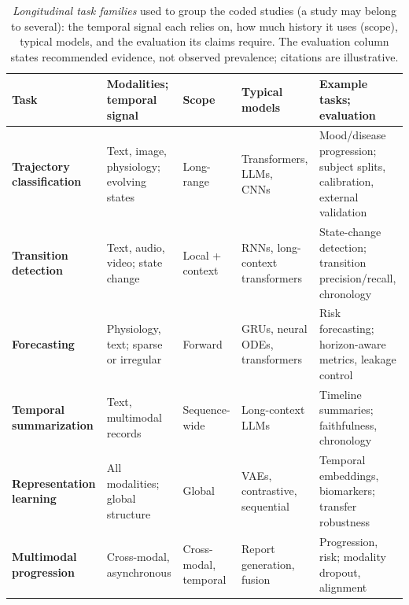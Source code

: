 \documentclass[11pt]{article}
\theoremstyle{plain}
\theoremstyle{definition}
\theoremstyle{remark}
\begin{document}
\begin{table}[!t]
\centering
\footnotesize
\setlength{\tabcolsep}{3pt}
\renewcommand{\arraystretch}{1.05}
\begin{tabularx}{\textwidth}{@{}>{\raggedright\arraybackslash\bfseries}p{2.15cm}>{\raggedright\arraybackslash}p{2.8cm}>{\raggedright\arraybackslash}p{1.8cm}>{\raggedright\arraybackslash}p{3.45cm}>{\raggedright\arraybackslash}X@{}}
\toprule
\rowcolor{gray!18}
\textbf{Task} & \textbf{Modalities; temporal signal} & \textbf{Scope} & \textbf{Typical models} & \textbf{Example tasks; evaluation} \\
\midrule
Trajectory classification & Text, image, physiology; evolving states & Long-range & Transformers, LLMs, CNNs~\cite{vaswani2023attentionneed,brown2020language} & Mood/disease progression; subject splits, calibration, external validation~\cite{rajkomar2018scalable,piryani2025itshightimesurvey} \\
Transition detection & Text, audio, video; state change & Local + context & RNNs, long-context transformers~\cite{10796324,beltagy2020longformer} & State-change detection; transition precision/recall, chronology~\cite{tsakalidis-etal-2022-identifying,lazaridou2021mindgapassessingtemporal} \\
Forecasting & Physiology, text; sparse or irregular & Forward & GRUs, neural ODEs, transformers~\cite{9338417,9374359} & Risk forecasting; horizon-aware metrics, leakage control~\cite{rajkomar2018scalable} \\
Temporal summarization & Text, multimodal records & Sequence-wide & Long-context LLMs~\cite{li2024long,qiu-etal-2024-large} & Timeline summaries; faithfulness, chronology~\cite{wu-etal-2025-unfolding,matero-etal-2024-using} \\
Representation learning & All modalities; global structure & Global & VAEs, contrastive, sequential~\cite{9761588,10385940} & Temporal embeddings, biomarkers; transfer robustness \\
Multimodal progression & Cross-modal, asynchronous & Cross-modal, temporal & Report generation, fusion~\cite{serra-etal-2023-controllable,10313489} & Progression, risk; modality dropout, alignment~\cite{10385940,10890535} \\
\bottomrule
\end{tabularx}
\caption{\textit{Longitudinal task families} used to group the coded studies (a study may belong to several): the temporal signal each relies on, how much history it uses (scope), typical models, and the evaluation its claims require. The evaluation column states recommended evidence, not observed prevalence; citations are illustrative.}\label{tab:unified_longitudinal_taxonomy}
\end{table}
\end{document}
